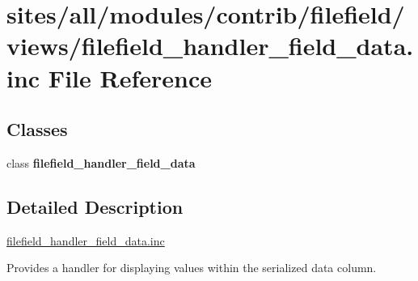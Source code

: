 \hypertarget{filefield__handler__field__data_8inc}{
\section{sites/all/modules/contrib/filefield/views/filefield\_\-handler\_\-field\_\-data.inc File Reference}
\label{filefield__handler__field__data_8inc}
}
\subsection*{Classes}
\begin{CompactItemize}
\item 
class \textbf{filefield\_\-handler\_\-field\_\-data}
\end{CompactItemize}


\subsection{Detailed Description}
\hyperlink{filefield__handler__field__data_8inc}{filefield\_\-handler\_\-field\_\-data.inc}

Provides a handler for displaying values within the serialized data column. 